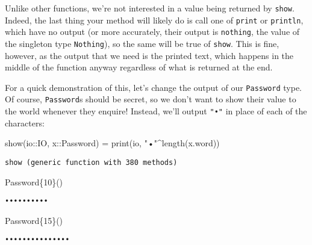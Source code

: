 \documentclass[
  letterpaper,
  DIV=11,
  numbers=noendperiod]{scrreprt}
\newenvironment{Shaded}{\begin{snugshade}}{\end{snugshade}}
\newcommand{\DataTypeTok}[1]{\textcolor[rgb]{0.68,0.00,0.00}{#1}}
\newcommand{\FunctionTok}[1]{\textcolor[rgb]{0.28,0.35,0.67}{#1}}
\newcommand{\NormalTok}[1]{\textcolor[rgb]{0.00,0.23,0.31}{#1}}
\newcommand{\OperatorTok}[1]{\textcolor[rgb]{0.37,0.37,0.37}{#1}}
\newcommand{\StringTok}[1]{\textcolor[rgb]{0.13,0.47,0.30}{#1}}
\begin{document}
Unlike other functions, we're not interested in a value being returned
by \texttt{show}. Indeed, the last thing your method will likely do is
call one of \texttt{print} or \texttt{println}, which have no output (or
more accurately, their output is \texttt{nothing}, the value of the
singleton type \texttt{Nothing}), so the same will be true of
\texttt{show}. This is fine, however, as the output that we need is the
printed text, which happens in the middle of the function anyway
regardless of what is returned at the end.

For a quick demonstration of this, let's change the output of our
\texttt{Password} type. Of course, \texttt{Password}s should be secret,
so we don't want to show their value to the world whenever they enquire!
Instead, we'll output \texttt{"•"} in place of each of the characters:

\begin{Shaded}
\begin{Highlighting}[]
\FunctionTok{show}\NormalTok{(io}\OperatorTok{::}\DataTypeTok{IO}\NormalTok{, x}\OperatorTok{::}\DataTypeTok{Password}\NormalTok{) }\OperatorTok{=} \FunctionTok{print}\NormalTok{(io, }\StringTok{"•"}\OperatorTok{\^{}}\FunctionTok{length}\NormalTok{(x.word))}
\end{Highlighting}
\end{Shaded}

\begin{verbatim}
show (generic function with 380 methods)
\end{verbatim}

\begin{Shaded}
\begin{Highlighting}[]
\FunctionTok{Password}\DataTypeTok{\{10\}}\NormalTok{()}
\end{Highlighting}
\end{Shaded}

\begin{verbatim}
••••••••••
\end{verbatim}

\begin{Shaded}
\begin{Highlighting}[]
\FunctionTok{Password}\DataTypeTok{\{15\}}\NormalTok{()}
\end{Highlighting}
\end{Shaded}

\begin{verbatim}
•••••••••••••••
\end{verbatim}
\end{document}
